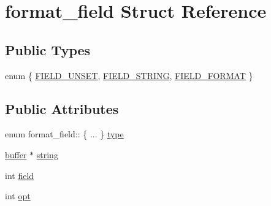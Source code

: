 \hypertarget{structformat__field}{\section{format\-\_\-field Struct Reference}
\label{structformat__field}
}
\subsection*{Public Types}
\begin{DoxyCompactItemize}
\item 
enum \{ \hyperlink{structformat__field_aa498572b29a9455193d9b26047e9ac4fac7428ab1b5f3e491525b81510fa9c846}{F\-I\-E\-L\-D\-\_\-\-U\-N\-S\-E\-T}, 
\hyperlink{structformat__field_aa498572b29a9455193d9b26047e9ac4fa045a3c204142a3a71e24aca353cc8768}{F\-I\-E\-L\-D\-\_\-\-S\-T\-R\-I\-N\-G}, 
\hyperlink{structformat__field_aa498572b29a9455193d9b26047e9ac4fa749d4313f17bf7bef29eea2b50693b2a}{F\-I\-E\-L\-D\-\_\-\-F\-O\-R\-M\-A\-T}
 \}
\end{DoxyCompactItemize}
\subsection*{Public Attributes}
\begin{DoxyCompactItemize}
\item 
enum format\-\_\-field\-:: \{ ... \}  \hyperlink{structformat__field_a64f5fef36457e9025a97f8a7cc847de8}{type}
\item 
\hyperlink{structbuffer}{buffer} $\ast$ \hyperlink{structformat__field_ae2afec07810d0e06a726b6125d0b8293}{string}
\item 
int \hyperlink{structformat__field_a77b18c92db9be790e5861c1a5ae9d72a}{field}
\item 
int \hyperlink{structformat__field_ad793744ac1aad9995e3f2c8c9b6165bc}{opt}
\end{DoxyCompactItemize}


